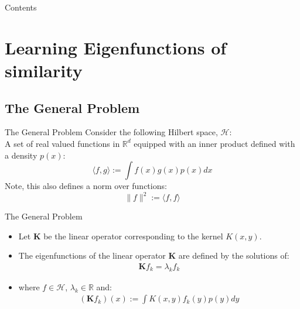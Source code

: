\documentclass[aspectratio=169]{beamer}
\begin{document}
\begin{frame}{Contents}
  \tableofcontents
\end{frame}
\section{Learning Eigenfunctions of similarity}
\subsection{The General Problem}
\begin{frame}{The General Problem}
  Consider the following Hilbert space, $\mathcal{H}$: 
  \\ \hfill \break
  A set of real valued functions in $\mathbb{R}^{d}$ equipped with an inner product defined with a density $p(x)$:
  \begin{equation*}
    \langle f,g \rangle := \int f(x)g(x)p(x)dx
  \end{equation*}
  Note, this also defines a norm over functions:
  \begin{equation*}
    \|f\|^{2} := \langle f,f \rangle
  \end{equation*}
\end{frame}

\begin{frame}{The General Problem}
  \begin{itemize}
    \item Let $\mathbf{K}$ be the linear operator corresponding to the kernel $K(x,y)$.
    \item The eigenfunctions of the linear operator $\mathbf{K}$ are defined by the solutions of:
      \begin{align*}
        \mathbf{K}f_{k} = \lambda_{k} f_{k}
      \end{align*}
    \item where $f \in \mathcal{H}$, $\lambda_{k} \in \mathbb{R}$ and:
      \begin{align*}
        (\mathbf{K}f_{k})(x) := \int K(x,y)f_{k}(y)p(y)dy
      \end{align*}
  \end{itemize}
\end{frame}
\end{document}
